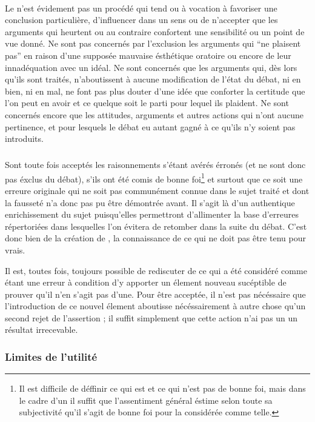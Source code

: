 \paragraph*{}
Le \mainabbr{} n’est évidement pas un procédé qui tend ou à vocation à favoriser une conclusion particulière, d’influencer dans un sens ou de n’accepter que les arguments qui heurtent ou au contraire confortent une sensibilité ou un point de vue donné. Ne sont pas concernés par l’exclusion les arguments qui \enquote{ne plaisent pas} en raison d’une supposée mauvaise ésthétique oratoire ou encore de leur innadéquation avec un idéal. Ne sont concernés que les arguments qui, dès lors qu’ils sont traités, n’aboutissent à aucune modification de l’état du débat, ni en bien, ni en mal, ne font pas plus douter d’une idée que conforter la certitude que l’on peut en avoir et ce quelque soit le parti pour lequel ils plaident. Ne sont concernés encore que les attitudes, arguments et autres actions qui n’ont aucune pertinence, et pour lesquels le débat eu {autant} gagné à ce qu’ils n’y soient pas introduits.

\subparagraph*{}
Sont toute fois acceptés les raisonnements s’étant avérés érronés (et ne sont donc pas éxclus du débat), s’ils ont été comis de bonne foi\footnote{Il est difficile de déffinir ce qui est et ce qui n’est pas de bonne foi, mais dans le cadre d’un \mainabbr{} il suffit que l’assentiment général éstime selon toute sa subjectivité qu’il s’agit de bonne foi pour la considérée comme telle.}
et surtout que ce soit une erreure originale qui ne soit pas communément connue dans le sujet traité et dont la fausseté n’a donc pas pu être démontrée avant. Il s’agit là d’un authentique enrichissement du sujet puisqu’elles permettront d’allimenter la base d’erreures répertoriées dans lesquelles l’on évitera de retomber dans la suite du débat. C’est donc bien de la création de , la connaissance de ce qui ne doit pas être tenu pour vrais.

Il est, toutes fois, toujours possible de rediscuter de ce qui a été considéré comme étant une erreur à condition d’y apporter un élement nouveau sucéptible de prouver qu’il n’en s’agit pas d’une. Pour être acceptée, il n’est pas nécéssaire que l’introduction de ce nouvel élement aboutisse nécéssairement à autre chose qu’un second rejet de l’assertion ; il suffit simplement que cette action n’ai pas un un résultat  irrecevable.

\subsubsection{Limites de l’utilité}
